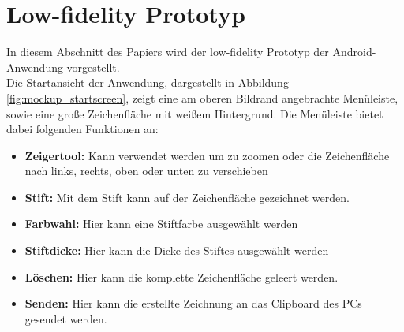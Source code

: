 \documentclass{chi-ext}
\begin{document}
\section{Low-fidelity Prototyp}
In diesem Abschnitt des Papiers wird der low-fidelity Prototyp der Android-Anwendung vorgestellt.\\

Die Startansicht der Anwendung, dargestellt in Abbildung \ref{fig:mockup_startscreen}, zeigt eine am oberen Bildrand angebrachte Menüleiste, sowie eine große Zeichenfläche mit weißem Hintergrund. 
Die Menüleiste bietet dabei folgenden Funktionen an:

\begin{itemize}
	\item {\textbf{Zeigertool:} Kann verwendet werden um zu zoomen oder die Zeichenfläche nach links, rechts, oben oder unten zu verschieben}
	\item {\textbf{Stift:} Mit dem Stift kann auf der Zeichenfläche gezeichnet werden.}
	\item {\textbf{Farbwahl:} Hier kann eine Stiftfarbe ausgewählt werden}
	\item {\textbf{Stiftdicke:} Hier kann die Dicke des Stiftes ausgewählt werden}
	\item {\textbf{Löschen:} Hier kann die komplette Zeichenfläche geleert werden.}
	\item {\textbf{Senden:} Hier kann die erstellte Zeichnung an das Clipboard des PCs gesendet werden.}
\end{itemize}
\end{document}
